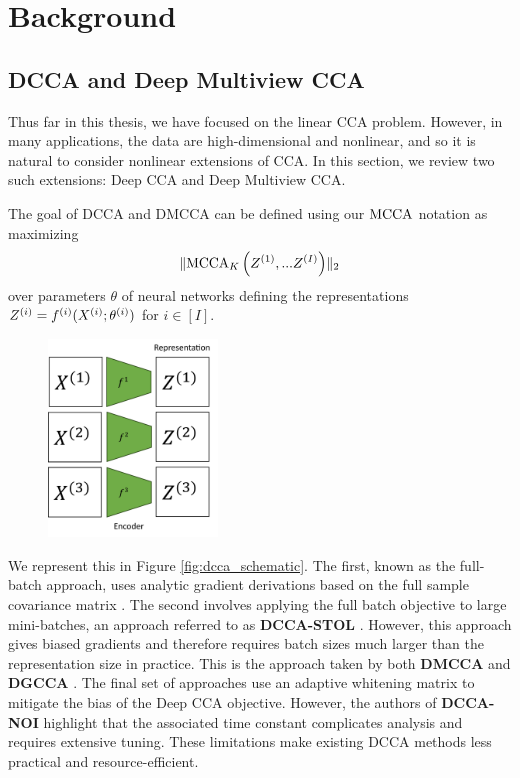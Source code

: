 \section{Background}

\subsection{DCCA and Deep Multiview CCA}

Thus far in this thesis, we have focused on the linear CCA problem.
However, in many applications, the data are high-dimensional and nonlinear, and so it is natural to consider nonlinear extensions of CCA.
In this section, we review two such extensions: Deep CCA and Deep Multiview CCA.

The goal of DCCA and DMCCA can be defined using our $\operatorname{MCCA}$ notation as maximizing
\begin{align}
    \label{eq:DMCCA-def}
    \lVert\operatorname{MCCA}_K\left(Z^{(1)}, ... Z^{(I)}\right)\rVert_2
\end{align}
over parameters $\theta$ of neural networks defining the representations $Z^{(i)}=f^{(i)}(X^{(i)};\theta^{(i)})$ for $i\in[I]$.

\begin{figure}
    \centering
    \includegraphics[width=0.4\textwidth]{figures/dcca_schematic}
\end{figure}

We represent this in Figure \ref{fig:dcca_schematic}.
The first, known as the full-batch approach, uses analytic gradient derivations based on the full sample covariance matrix \citep{andrew2013deep}.
The second involves applying the full batch objective to large mini-batches, an approach referred to as \textbf{DCCA-STOL} \citep{wang2015unsupervised}.
However, this approach gives biased gradients and therefore requires batch sizes much larger than the representation size in practice.
This is the approach taken by both \textbf{DMCCA} \citep{somandepalli2019multimodal} and \textbf{DGCCA} \citep{benton2017deep} .
The final set of approaches use an adaptive whitening matrix \citep{wang2015stochastic, chang2018scalable} to mitigate the bias of the Deep CCA objective. However, the authors of \textbf{DCCA-NOI} highlight that the associated time constant complicates analysis and requires extensive tuning.
These limitations make existing DCCA methods less practical and resource-efficient.


